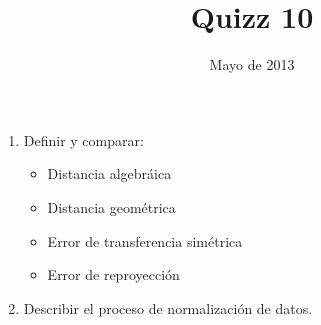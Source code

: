 \documentclass{IEEEtran}
\begin{document}
\title{Quizz 10}
\date {Mayo de 2013}
\author{
}
\maketitle

\begin{enumerate}
\item Definir y comparar:
\begin{itemize}
\item Distancia algebráica
\item Distancia geométrica
\item Error de transferencia simétrica
\item Error de reproyección
\end{itemize} 
\item Describir el proceso de normalización de datos.
\end{enumerate} 
\end{document}
